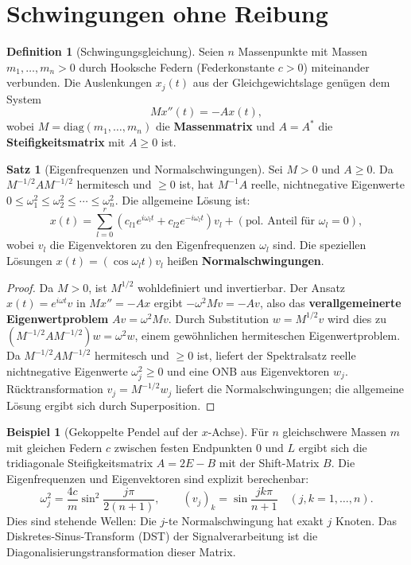 ﻿\documentclass[a4paper,12pt]{report}
\theoremstyle{definition}
\newtheorem{definition}{Definition}
\newtheorem{beispiel}{Beispiel}
\newtheorem{satz}{Satz}
\begin{document}
\section{Schwingungen ohne Reibung}

\begin{definition}[Schwingungsgleichung]
    Seien $n$ Massenpunkte mit Massen $m_1, \dots, m_n > 0$ durch
    Hooksche Federn (Federkonstante $c > 0$) miteinander verbunden.
    Die Auslenkungen $x_j(t)$ aus der Gleichgewichtslage genügen dem
    System
    \[
        M x''(t) = -A x(t),
    \]
    wobei $M = \mathrm{diag}(m_1, \dots, m_n)$ die \textbf{Massenmatrix}
    und $A = A^*$ die \textbf{Steifigkeitsmatrix} mit $A \geq 0$ ist.
\end{definition}

\begin{satz}[Eigenfrequenzen und Normalschwingungen]
    Sei $M > 0$ und $A \geq 0$. Da $M^{-1/2} A M^{-1/2}$ hermitesch
    und $\geq 0$ ist, hat $M^{-1}A$ reelle, nichtnegative Eigenwerte
    $0 \leq \omega_1^2 \leq \omega_2^2 \leq \cdots \leq \omega_n^2$.
    Die allgemeine Lösung ist:
    \[
        x(t) = \sum_{l=0}^{r} (c_{l1} e^{i\omega_l t} + c_{l2} e^{-i\omega_l t})
        v_l + (\text{pol. Anteil für } \omega_l = 0),
    \]
    wobei $v_l$ die Eigenvektoren zu den Eigenfrequenzen $\omega_l$ sind.
    Die speziellen Lösungen $x(t) = (\cos \omega_l t) v_l$ heißen
    \textbf{Normalschwingungen}.
\end{satz}
\begin{proof}
    Da $M > 0$, ist $M^{1/2}$ wohldefiniert und invertierbar. Der Ansatz
    $x(t) = e^{i\omega t} v$ in $Mx'' = -Ax$ ergibt $-\omega^2 M v = -Av$,
    also das \textbf{verallgemeinerte Eigenwertproblem} $Av = \omega^2 M v$.
    Durch Substitution $w = M^{1/2} v$ wird dies zu $(M^{-1/2} A M^{-1/2}) w = \omega^2 w$,
    einem gewöhnlichen hermiteschen Eigenwertproblem.
    Da $M^{-1/2} A M^{-1/2}$ hermitesch und $\geq 0$ ist, liefert der Spektralsatz
    reelle nichtnegative Eigenwerte $\omega_j^2 \geq 0$ und eine ONB aus
    Eigenvektoren $w_j$. Rücktransformation $v_j = M^{-1/2} w_j$ liefert
    die Normalschwingungen; die allgemeine Lösung ergibt sich durch Superposition.
\end{proof}


\begin{beispiel}[Gekoppelte Pendel auf der $x$-Achse]
    Für $n$ gleichschwere Massen $m$ mit gleichen Federn $c$ zwischen
    festen Endpunkten $0$ und $L$ ergibt sich die tridiagonale
    Steifigkeitsmatrix $A = 2E - B$ mit der Shift-Matrix $B$.
    Die Eigenfrequenzen und Eigenvektoren sind explizit berechenbar:
    \[
        \omega_j^2 = \frac{4c}{m} \sin^2\!\frac{j\pi}{2(n+1)},
        \qquad
        (v_j)_k = \sin\frac{jk\pi}{n+1} \quad (j, k = 1, \dots, n).
    \]
    Dies sind stehende Wellen: Die $j$-te Normalschwingung hat exakt
    $j$ Knoten. Das Diskretes-Sinus-Transform (DST) der Signalverarbeitung
    ist die Diagonalisierungstransformation dieser Matrix.
\end{beispiel}
\end{document}
